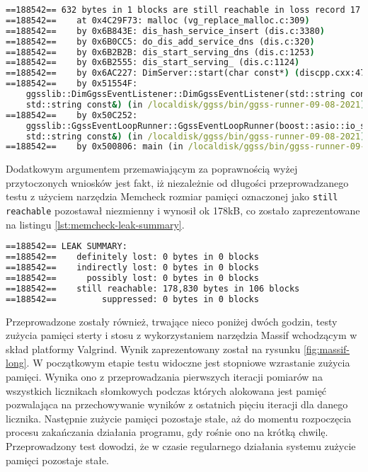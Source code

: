 \begin{lstlisting}[language=cmd,caption={Przkładowy błąd raportowany przez narzędzie Memcheck},frame=single, label={lst:memcheck-error}]
==188542== 632 bytes in 1 blocks are still reachable in loss record 17 of 37
==188542==    at 0x4C29F73: malloc (vg_replace_malloc.c:309)
==188542==    by 0x6B843E: dis_hash_service_insert (dis.c:3380)
==188542==    by 0x6B0CC5: do_dis_add_service_dns (dis.c:320)
==188542==    by 0x6B2B2B: dis_start_serving_dns (dis.c:1253)
==188542==    by 0x6B2555: dis_start_serving_ (dis.c:1124)
==188542==    by 0x6AC227: DimServer::start(char const*) (discpp.cxx:476)
==188542==    by 0x51554F: 
    ggsslib::DimGgssEventListener::DimGgssEventListener(std::string const&, 
    std::string const&) (in /localdisk/ggss/bin/ggss-runner-09-08-2021)
==188542==    by 0x50C252: 
    ggsslib::GgssEventLoopRunner::GgssEventLoopRunner(boost::asio::io_service&, 
    std::string const&) (in /localdisk/ggss/bin/ggss-runner-09-08-2021)
==188542==    by 0x500806: main (in /localdisk/ggss/bin/ggss-runner-09-08-2021)
\end{lstlisting}

Dodatkowym argumentem przemawiającym za poprawnością wyżej przytoczonych wniosków jest fakt, iż niezależnie od długości przeprowadzanego testu z użyciem narzędzia Memcheck rozmiar pamięci oznaczonej jako \lstinline{still reachable} pozostawał niezmienny i wynosił ok 178kB, co zostało zaprezentowane na listingu \ref{lst:memcheck-leak-summary}.

\begin{lstlisting}[language=cmd,caption={Podsumowanie wycieków raportowane przez narzędzie Memcheck},frame=single, label={lst:memcheck-leak-summary}]
==188542== LEAK SUMMARY:
==188542==    definitely lost: 0 bytes in 0 blocks
==188542==    indirectly lost: 0 bytes in 0 blocks
==188542==      possibly lost: 0 bytes in 0 blocks
==188542==    still reachable: 178,830 bytes in 106 blocks
==188542==         suppressed: 0 bytes in 0 blocks
\end{lstlisting}

Przeprowadzone zostały również, trwające nieco poniżej dwóch godzin, testy zużycia pamięci sterty i stosu z wykorzystaniem narzędzia Massif wchodzącym w skład platformy Valgrind. Wynik zaprezentowany został na rysunku \ref{fig:massif-long}. W początkowym etapie testu widoczne jest stopniowe wzrastanie zużycia pamięci. Wynika ono z  przeprowadzania pierwszych iteracji pomiarów na wszystkich licznikach słomkowych podczas których alokowana jest pamięć pozwalająca na przechowywanie wyników z ostatnich pięciu iteracji dla danego licznika. Następnie zużycie pamięci pozostaje stałe, aż do momentu rozpoczęcia procesu zakańczania działania programu, gdy rośnie ono na krótką chwilę. Przeprowadzony test dowodzi, że w czasie regularnego działania systemu zużycie pamięci pozostaje stałe.


